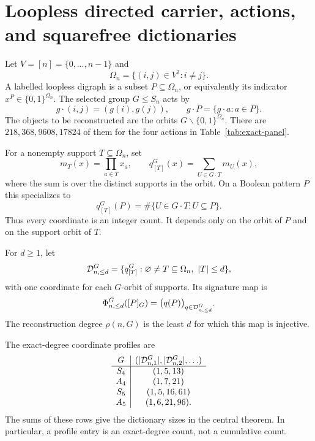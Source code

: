 \section{Loopless directed carrier, actions, and squarefree dictionaries}
\label{sec:model}

Let $V=[n]=\{0,\ldots,n-1\}$ and
\[
  \Omega_n=\{(i,j)\in V^2:i\neq j\}.
\]
A labelled loopless digraph is a subset $P\subseteq\Omega_n$, or equivalently
its indicator $x^P\in\{0,1\}^{\Omega_n}$.  The selected group $G\leq S_n$
acts by
\[
  g\cdot(i,j)=(g(i),g(j)),\qquad
  g\cdot P=\{g\cdot a:a\in P\}.
\]
The objects to be reconstructed are the orbits $G\backslash
\{0,1\}^{\Omega_n}$.  There are $218,368,9608,17824$ of them for the four
actions in Table~\ref{tab:exact-panel}.

For a nonempty support $T\subseteq\Omega_n$, set
\[
  m_T(x)=\prod_{a\in T}x_a,
  \qquad
  q^G_{[T]}(x)=\sum_{U\in G\cdot T}m_U(x),
\]
where the sum is over the distinct supports in the orbit.  On a Boolean
pattern $P$ this specializes to
\begin{equation}
  q^G_{[T]}(P)=\#\{U\in G\cdot T:U\subseteq P\}.
  \label{eq:contained-support-count}
\end{equation}
Thus every coordinate is an integer count.  It depends only on the orbit of
$P$ and on the support orbit of $T$.

\begin{definition}
For $d\geq1$, let
\[
  \mathcal{D}^G_{n,\leq d}
   =\{q^G_{[T]}: \varnothing\neq T\subseteq\Omega_n,
       \ |T|\leq d\},
\]
with one coordinate for each $G$-orbit of supports.  Its signature map is
\[
  \Phi^G_{n,\leq d}([P]_G)
   =\bigl(q(P)\bigr)_{q\in\mathcal{D}^G_{n,\leq d}}.
\]
The reconstruction degree $\rho(n,G)$ is the least $d$ for which this map is
injective.
\end{definition}

The exact-degree coordinate profiles are
\[
\begin{array}{c|c}
G & (|\mathcal{D}^G_{n,1}|,|\mathcal{D}^G_{n,2}|,\ldots)\\ \hline
S_4&(1,5,13)\\
A_4&(1,7,21)\\
S_5&(1,5,16,61)\\
A_5&(1,6,21,96).
\end{array}
\]
The sums of these rows give the dictionary sizes in the central theorem.  In
particular, a profile entry is an exact-degree count, not a cumulative count.

